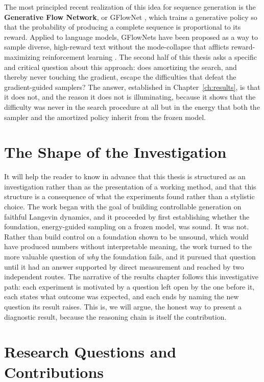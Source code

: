 The most principled recent realization of this idea for sequence generation is the \textbf{Generative Flow Network}, or GFlowNet \citep{bengio2021flow, bengio2023gflownet}, which trains a generative policy so that the probability of producing a complete sequence is proportional to its reward. Applied to language models, GFlowNets have been proposed as a way to sample diverse, high-reward text without the mode-collapse that afflicts reward-maximizing reinforcement learning \citep{hu2024amortizing}. The second half of this thesis asks a specific and critical question about this approach: does amortizing the search, and thereby never touching the gradient, escape the difficulties that defeat the gradient-guided samplers? The answer, established in Chapter~\ref{ch:results}, is that it does not, and the reason it does not is illuminating, because it shows that the difficulty was never in the search procedure at all but in the energy that both the sampler and the amortized policy inherit from the frozen model.

\section{The Shape of the Investigation}
\label{sec:intro-shape}

It will help the reader to know in advance that this thesis is structured as an investigation rather than as the presentation of a working method, and that this structure is a consequence of what the experiments found rather than a stylistic choice. The work began with the goal of building controllable generation on faithful Langevin dynamics, and it proceeded by first establishing whether the foundation, energy-guided sampling on a frozen model, was sound. It was not. Rather than build control on a foundation shown to be unsound, which would have produced numbers without interpretable meaning, the work turned to the more valuable question of \emph{why} the foundation fails, and it pursued that question until it had an answer supported by direct measurement and reached by two independent routes. The narrative of the results chapter follows this investigative path: each experiment is motivated by a question left open by the one before it, each states what outcome was expected, and each ends by naming the new question its result raises. This is, we will argue, the honest way to present a diagnostic result, because the reasoning chain is itself the contribution.

\section{Research Questions and Contributions}
\label{sec:intro-rqs}

